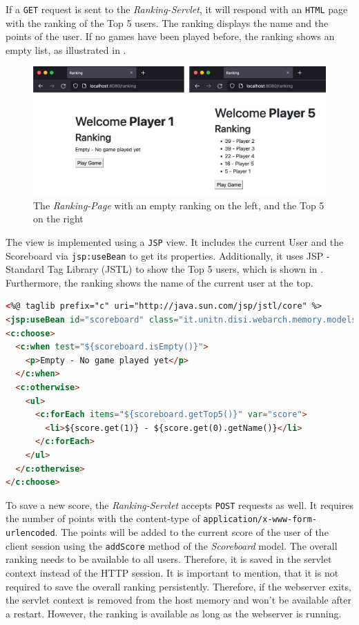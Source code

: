 If a \texttt{GET} request is sent to the \textit{Ranking-Servlet}, it will respond with an \texttt{HTML} page with the ranking of the Top 5 users. The ranking displays the name and the points of the user. If no games have been played before, the ranking shows an empty list, as illustrated in .
\begin{figure}[h]
\centering
\includegraphics[scale=0.2]{images/03_impl/ranking/ranking}
\caption{The \textit{Ranking-Page} with an empty ranking on the left, and the Top 5 on the right}
\label{fig:03_impl_backend_ranking_page}
\end{figure}

The view is implemented using a \texttt{JSP} view. It includes the current User and the Scoreboard via \texttt{jsp:useBean} to get its properties.
Additionally, it uses JSP - Standard Tag Library (JSTL) to show the Top 5 users, which is shown in . Furthermore, the ranking shows the name of the current user at the top.
\begin{lstlisting}[label=lst:03_impl_backend_ranking_jstl, caption=Show the Top 5 using JSTL, language=html]
<%@ taglib prefix="c" uri="http://java.sun.com/jsp/jstl/core" %>
<jsp:useBean id="scoreboard" class="it.unitn.disi.webarch.memory.models.Scoreboard" scope="application"/>
<c:choose>
  <c:when test="${scoreboard.isEmpty()}">
    <p>Empty - No game played yet</p>
  </c:when>
  <c:otherwise>
    <ul>
      <c:forEach items="${scoreboard.getTop5()}" var="score">
        <li>${score.get(1)} - ${score.get(0).getName()}</li>
      </c:forEach>
    </ul>
  </c:otherwise>
</c:choose>
\end{lstlisting}


To save a new score, the \textit{Ranking-Servlet} accepts \texttt{POST} requests as well. It requires the number of points with the content-type of \texttt{application/x-www-form-urlencoded}.
The points will be added to the current score of the user of the client session using the \texttt{addScore} method of the \textit{Scoreboard} model.
The overall ranking needs to be available to all users. Therefore, it is saved in the servlet context instead of the HTTP session.
It is important to mention, that it is not required to save the overall ranking persistently. Therefore, if the webserver exits, the servlet context is removed from the host memory and won't be available after a restart. However, the ranking is available as long as the webserver is running.

